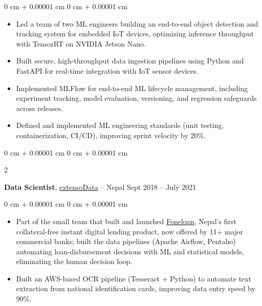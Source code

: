 \documentclass[10pt, letterpaper]{article}
\newenvironment{highlights}{
    \begin{itemize}[
        topsep=0.04 cm,
        parsep=0.04 cm,
        partopsep=0pt,
        itemsep=0pt,
        leftmargin=0 cm + 10pt
    ]
}{
    \end{itemize}
} %
\newenvironment{onecolentry}{
    \begin{adjustwidth}{
        0 cm + 0.00001 cm
    }{
        0 cm + 0.00001 cm
    }
}{
    \end{adjustwidth}
} %
\newenvironment{twocolentry}[2][]{
    \onecolentry
    \def\secondColumn{#2}
    \setcolumnwidth{\fill, 4.5 cm}
    \begin{paracol}{2}
}{
    \switchcolumn \raggedleft \secondColumn
    \end{paracol}
    \endonecolentry
} %
\begin{document}
        \vspace{0.06 cm}
        \begin{onecolentry}
            \begin{highlights}
                \item Led a team of two ML engineers building an end-to-end object detection and tracking system for embedded IoT devices, optimizing inference throughput with TensorRT on NVIDIA Jetson Nano.
                \item Built secure, high-throughput data ingestion pipelines using Python and FastAPI for real-time integration with IoT sensor devices.
                \item Implemented MLFlow for end-to-end ML lifecycle management, including experiment tracking, model evaluation, versioning, and regression safeguards across releases.
                \item Defined and implemented ML engineering standards (unit testing, containerization, CI/CD), improving sprint velocity by 20\%.
            \end{highlights}
        \end{onecolentry}

        \vspace{0.12 cm}

    \begin{twocolentry}{
            Sept 2018 – July 2021
        }
            \textbf{Data Scientist}, \href{https://www.extensodata.com/}{extensoData} -- Nepal\end{twocolentry}

        \vspace{0.06 cm}
        \begin{onecolentry}
            \begin{highlights}
                \item Part of the small team that built and launched \href{https://foneloan.com.np/}{Foneloan}, Nepal's first collateral-free instant digital lending product, now offered by 11+ major commercial banks; built the data pipelines (Apache Airflow, Pentaho) automating loan-disbursement decisions with ML and statistical models, eliminating the human decision loop.
                \item Built an AWS-based OCR pipeline (Tesseract + Python) to automate text extraction from national identification cards, improving data entry speed by 90\%.
                
            \end{highlights}
        \end{onecolentry}
\end{document}
